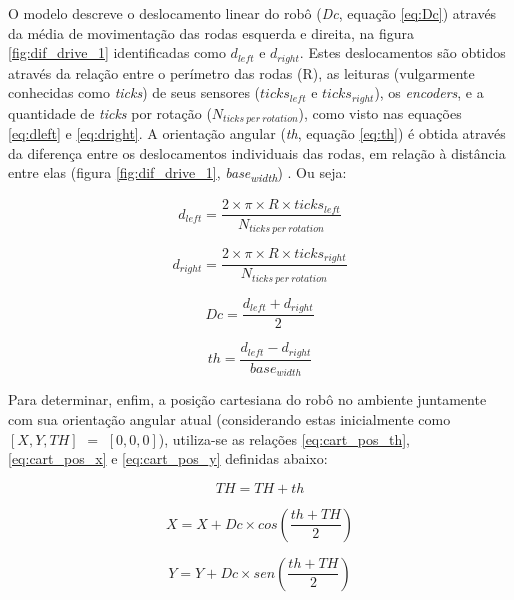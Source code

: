 \documentclass[
	12pt,				%
	openright,			%
	oneside,			%
	a4paper,			%
	english,			%
	french,				%
	spanish,			%
	brazil,				%
	]{abntex2}
\begin{document}
O modelo descreve o deslocamento linear do robô (\emph{Dc}, equação \ref{eq:Dc}) através da média de movimentação das rodas esquerda e direita, na figura \ref{fig:dif_drive_1} identificadas como $d_{left}$ e $d_{right}$. Estes deslocamentos são obtidos através da relação entre o perímetro das rodas (R), as leituras (vulgarmente conhecidas como \emph{ticks}) de seus sensores ($ticks_{left}$ e $ticks_{right}$), os \emph{encoders}, e a quantidade de \emph{ticks} por rotação ($N_{ticks~per~rotation}$), como visto nas equações \ref{eq:dleft} e \ref{eq:dright}.  A orientação angular (\emph{th}, equação \ref{eq:th}) é obtida através da diferença entre os deslocamentos individuais das rodas, em relação à distância entre elas (figura \ref{fig:dif_drive_1}, \emph{base\textsubscript{width}}) \cite{tcc_alex}. Ou seja:

\begin{equation}
    d_{left} = \frac{2 \times \pi \times R \times ticks_{left}}{N_{ticks~per~rotation}}
    \label{eq:dleft}
\end{equation}

\begin{equation}
    d_{right} = \frac{2 \times \pi \times R \times ticks_{right}}{N_{ticks~per~rotation}}
    \label{eq:dright}
\end{equation}

\begin{equation}
    Dc = \frac{d_{left} + d_{right}}{2}
    \label{eq:Dc}
\end{equation}

\begin{equation}
    th = \frac{d_{left} - d_{right}}{base_{width}}
    \label{eq:th}
\end{equation}

Para determinar, enfim, a posição cartesiana do robô no ambiente juntamente com sua orientação angular atual (considerando estas inicialmente como $[X,Y,TH]\,\, = \,\,[0,0,0]$), utiliza-se as relações \ref{eq:cart_pos_th}, \ref{eq:cart_pos_x} e \ref{eq:cart_pos_y} definidas abaixo:

\begin{equation}
    TH = TH + th
    \label{eq:cart_pos_th}
\end{equation}

\begin{equation}
    X = X + Dc \times cos\left(\frac{th+TH}{2}\right)
    \label{eq:cart_pos_x}
\end{equation}

\begin{equation}
    Y = Y + Dc \times sen\left(\frac{th+TH}{2}\right)
    \label{eq:cart_pos_y}
\end{equation}
\end{document}
